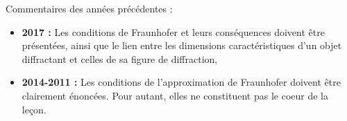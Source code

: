 \begin{reportBlock}{Commentaires des années précédentes :}
    \begin{itemize}
        \item \textbf{2017 :} Les conditions de Fraunhofer et leurs conséquences doivent être présentées, ainsi que le lien entre les dimensions caractéristiques d’un objet diffractant et celles de sa figure de diffraction,
        \item \textbf{2014-2011 :} Les conditions de l’approximation de Fraunhofer doivent être clairement énoncées. Pour autant, elles ne constituent pas le coeur de la leçon.
    \end{itemize}
\end{reportBlock}
